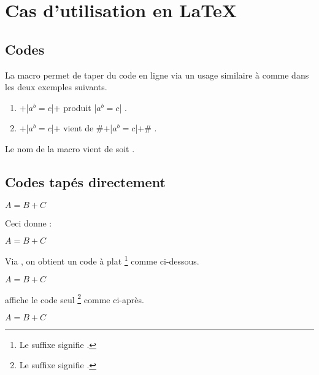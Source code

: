 \documentclass[12pt,a4paper]{article}
\begin{document}
\section{Cas d'utilisation en \LaTeX}

\subsection{Codes }

La macro  permet de taper du code en ligne via un usage similaire à  comme dans les deux exemples suivants.

\begin{enumerate}
    \item \docilatex+\docilatex|$a^b = c$|+ produit \docilatex|$a^b = c$| .

    \item \docilatex+\docilatex|$a^b = c$|+ vient de \docilatex#\docilatex+\docilatex|$a^b = c$|+# .
\end{enumerate}


\begin{docrem}
    Le nom de la macro  vient de  soit .
\end{docrem}




\subsection{Codes tapés directement}





\begin{doclatex-alone}
\begin{doclatex}
    $A = B + C$
\end{doclatex}
\end{doclatex-alone}

Ceci donne :

\begin{doclatex}
    $A = B + C$
\end{doclatex}




\docexa[À la suite]

Via , on obtient un code à plat
\footnote{
    Le suffixe  signifie .
}
comme ci-dessous.

\begin{doclatex-flat}
    $A = B + C$
\end{doclatex-flat}





 affiche le code seul
\footnote{
    Le suffixe  signifie .
}
comme ci-après.

\begin{doclatex-alone}
    $A = B + C$
\end{doclatex-alone}
\end{document}
